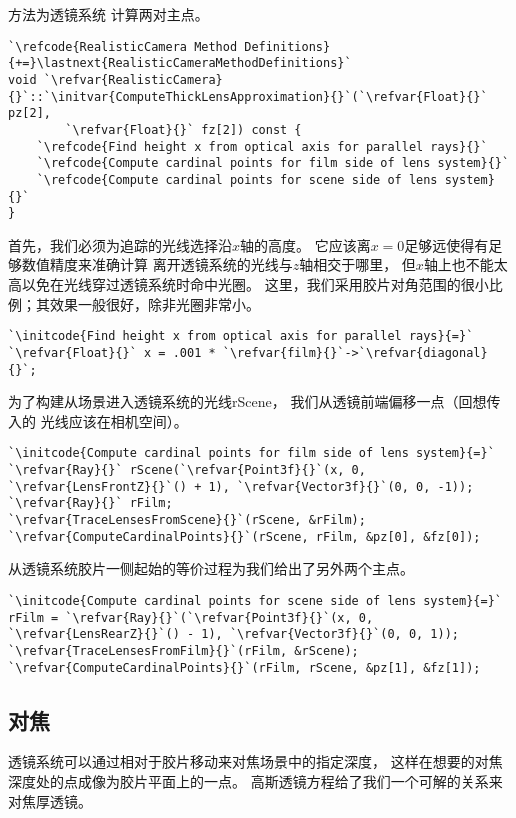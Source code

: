 方法为透镜系统
计算两对主点。
\begin{lstlisting}
`\refcode{RealisticCamera Method Definitions}{+=}\lastnext{RealisticCameraMethodDefinitions}`
void `\refvar{RealisticCamera}{}`::`\initvar{ComputeThickLensApproximation}{}`(`\refvar{Float}{}` pz[2],
        `\refvar{Float}{}` fz[2]) const {
    `\refcode{Find height x from optical axis for parallel rays}{}`
    `\refcode{Compute cardinal points for film side of lens system}{}`
    `\refcode{Compute cardinal points for scene side of lens system}{}`
}
\end{lstlisting}

首先，我们必须为追踪的光线选择沿$x$轴的高度。
它应该离$x=0$足够远使得有足够数值精度来准确计算
离开透镜系统的光线与$z$轴相交于哪里，
但$x$轴上也不能太高以免在光线穿过透镜系统时命中光圈。
这里，我们采用胶片对角范围的很小比例；其效果一般很好，除非光圈非常小。
\begin{lstlisting}
`\initcode{Find height x from optical axis for parallel rays}{=}`
`\refvar{Float}{}` x = .001 * `\refvar{film}{}`->`\refvar{diagonal}{}`;
\end{lstlisting}

为了构建从场景进入透镜系统的光线{\ttfamily rScene}，
我们从透镜前端偏移一点（回想传入的
光线应该在相机空间）。
\begin{lstlisting}
`\initcode{Compute cardinal points for film side of lens system}{=}`
`\refvar{Ray}{}` rScene(`\refvar{Point3f}{}`(x, 0, `\refvar{LensFrontZ}{}`() + 1), `\refvar{Vector3f}{}`(0, 0, -1));
`\refvar{Ray}{}` rFilm;
`\refvar{TraceLensesFromScene}{}`(rScene, &rFilm);
`\refvar{ComputeCardinalPoints}{}`(rScene, rFilm, &pz[0], &fz[0]);
\end{lstlisting}

从透镜系统胶片一侧起始的等价过程为我们给出了另外两个主点。
\begin{lstlisting}
`\initcode{Compute cardinal points for scene side of lens system}{=}`
rFilm = `\refvar{Ray}{}`(`\refvar{Point3f}{}`(x, 0, `\refvar{LensRearZ}{}`() - 1), `\refvar{Vector3f}{}`(0, 0, 1));
`\refvar{TraceLensesFromFilm}{}`(rFilm, &rScene);
`\refvar{ComputeCardinalPoints}{}`(rFilm, rScene, &pz[1], &fz[1]);
\end{lstlisting}

\subsection{对焦}\label{sub:对焦}
透镜系统可以通过相对于胶片移动来对焦场景中的指定深度，
这样在想要的对焦深度处的点成像为胶片平面上的一点。
高斯透镜方程给了我们一个可解的关系来对焦厚透镜。

